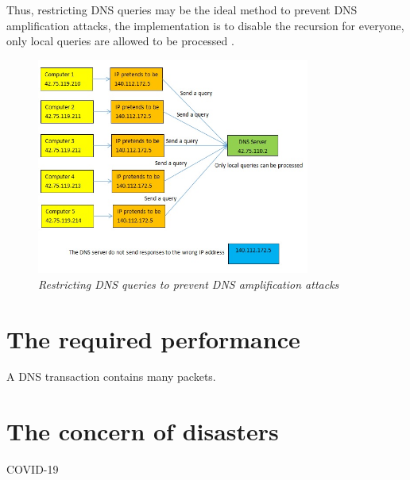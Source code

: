 Thus, restricting DNS queries may be the ideal method to prevent DNS amplification attacks, the implementation is to disable the recursion for everyone, only local queries are allowed to be processed \cite{Why_recursive_dns_not_recommended_web}.
\\

\begin{figure}[hbt!]  
    \centering
    \includegraphics[width=0.8\textwidth]{figure/only_local_queries.jpg}
    \caption{\em Restricting DNS queries to prevent DNS amplification attacks \cite{Why_recursive_dns_not_recommended_video} \label{fig:restricting_DNS_queries}}
\end{figure}


\section{The required performance}

A DNS transaction contains many packets.

\section{The concern of disasters}

COVID-19
\\
